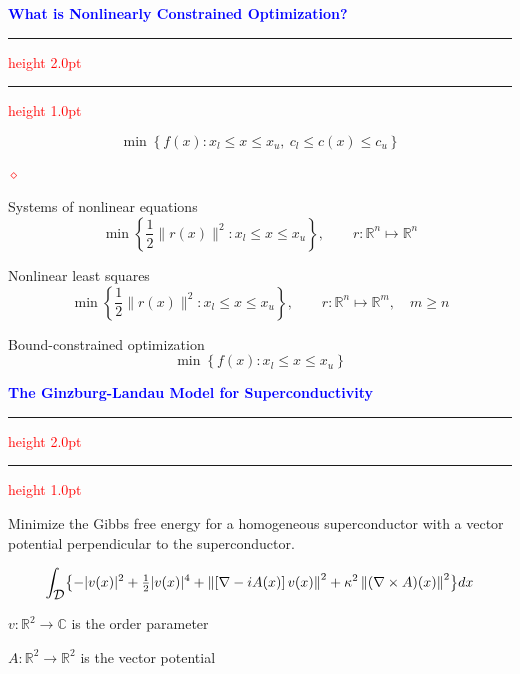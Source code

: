 \documentclass{seminar}
\newcommand{\R}{\mbox{${\mathbb R}$}}
\newcommand{\C}{\mbox{${\mathbb C}$}}
\newcommand{\grad}{\nabla}
\newcommand{\half}{{\textstyle{\frac{1}{2}}}}
\newcommand{\reddiamond}{\textcolor{red}{$\diamond$}}
\newcommand{\redstripe}{\textcolor{red}{\hrule height 2.0pt\hfil}
             \vspace{-1.8pt}
             \textcolor{red}{\hrule height 1.0pt\hfil}
}
\newcommand{\heading}[1]{%
   \centerline{\textcolor{blue}{\textbf{#1}}}%
    \redstripe%
    \bigskip
}
\newcommand{\cD} {\mbox{$\cal D$}}
\begin{document}
\begin{slide}

\heading{What is Nonlinearly Constrained Optimization?}

\[
\min \left \{ f(x): x_l \le x \le x_u , \ c_l \le c(x) \le c_u \right \}
\]

\medskip

\begin{list}{\reddiamond}{\setlength{\itemsep}{0pt}}
\item
Systems of nonlinear equations
\[
\min \left \{ \half \| r(x) \|^2 : x_l \le x \le x_u \right \} , \qquad
r : \R^n \mapsto \R^n
\]
\item
Nonlinear least squares
\[
\min \left \{ \half \| r(x) \|^2 : x_l \le x \le x_u \right \} , \qquad
r : \R^n \mapsto \R^m, \quad m \ge n
\]
\item
Bound-constrained optimization
\[
\min \left \{  f(x) : x_l \le x \le x_u \right \}
\]
\end{list}

\vfill

\end{slide}

%  
%  
%  
%  
%  
%  

\begin{slide}

\heading{The Ginzburg-Landau Model for Superconductivity}

Minimize the Gibbs free energy for a homogeneous superconductor with a vector
potential perpendicular to the superconductor.

{\small
\[
\int _ {\cD} \bigl \{ - | v (x) |^2 + \half | v (x) |^4  + 
\left \| \left [ \nabla - i A(x) \right ] v (x) \right \| ^2  +  \\
\kappa^2 \left \| ( \grad \times A ) (x) \right \| ^2 \bigr \} dx
\]
}

\medskip

\begin{center}
$ v : \R^2 \to \C$ is the order parameter

$A : \R^2 \to \R^2 $ is the vector potential
\end{center}

\vfill

\end{slide}
\end{document}

